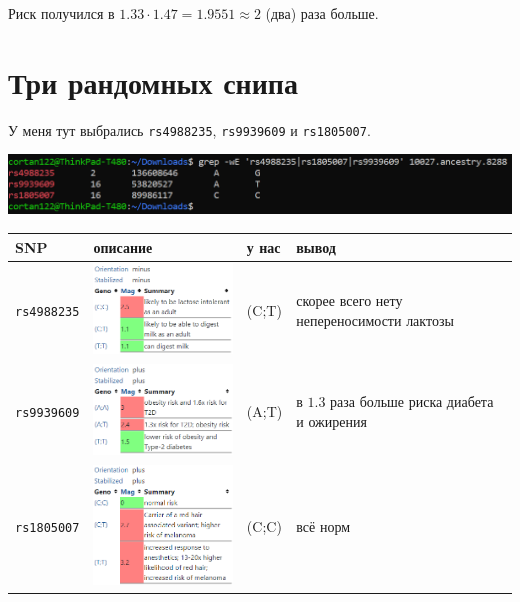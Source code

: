 \documentclass{article}
\begin{document}
  Риск получился в $1.33 \cdot 1.47 = 1.9551 \approx 2$ (два) раза больше.

  \section{Три рандомных снипа}
  У меня тут выбрались \texttt{rs4988235}, \texttt{rs9939609} и \texttt{rs1805007}.

  \noindent
  \includegraphics[width=\textwidth]{image20210313170346.png}

  \begin{center}
    \begin{tabular}{|l|l|l|l|}
      \hline
      \textbf{SNP} & \textbf{описание} & \textbf{у нас} & \textbf{вывод} \\
      \hline\hline
      \texttt{rs4988235} & \includegraphics[width=5cm]{rs4988235.png} & (C;T) & скорее всего нету непереносимости лактозы \\\hline
      \texttt{rs9939609} & \includegraphics[width=5cm]{rs9939609.png} & (A;T) & в $1.3$ раза больше риска диабета и ожирения \\\hline
      \texttt{rs1805007} & \includegraphics[width=5cm]{rs1805007.png} & (C;C) & всё норм \\\hline
    \end{tabular}
  \end{center}
\end{document}
